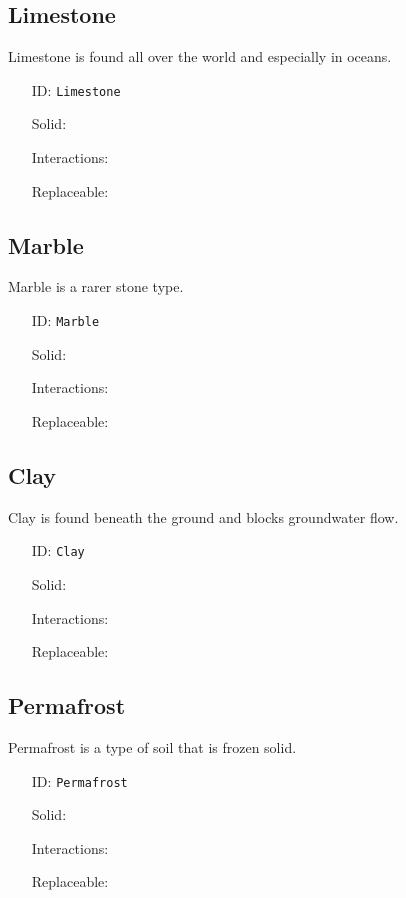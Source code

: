 \subsection{Limestone}\label{subsec:blocks_limestone}
Limestone is found all over the world and especially in oceans.
\newline
\begin{itemize}[nosep]
\item[ID:] \texttt{Limestone}
\item[Solid:]  \Checkmark \item[Interactions:]  \XSolidBrush \item[Replaceable:]  \XSolidBrush \end{itemize}

\subsection{Marble}\label{subsec:blocks_marble}
Marble is a rarer stone type.
\newline
\begin{itemize}[nosep]
\item[ID:] \texttt{Marble}
\item[Solid:]  \Checkmark \item[Interactions:]  \XSolidBrush \item[Replaceable:]  \XSolidBrush \end{itemize}

\subsection{Clay}\label{subsec:blocks_clay}
Clay is found beneath the ground and blocks groundwater flow.
\newline
\begin{itemize}[nosep]
\item[ID:] \texttt{Clay}
\item[Solid:]  \Checkmark \item[Interactions:]  \XSolidBrush \item[Replaceable:]  \XSolidBrush \end{itemize}

\subsection{Permafrost}\label{subsec:blocks_permafrost}
Permafrost is a type of soil that is frozen solid.
\newline
\begin{itemize}[nosep]
\item[ID:] \texttt{Permafrost}
\item[Solid:]  \Checkmark \item[Interactions:]  \XSolidBrush \item[Replaceable:]  \XSolidBrush \end{itemize}

